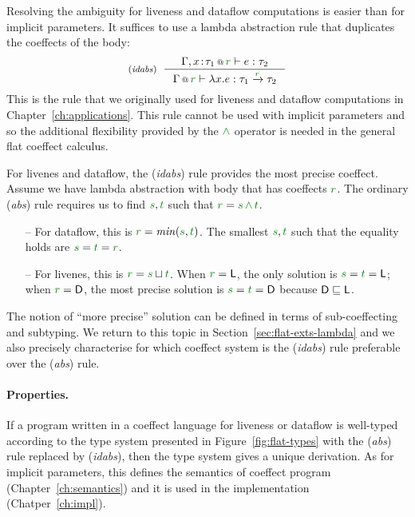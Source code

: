 Resolving the ambiguity for liveness and dataflow computations is easier than for implicit
parameters. It suffices to use a lambda abstraction rule that duplicates the coeffects of the
body:
%
\begin{equation*}
\tyrule{idabs}
  {\coctx{\Gamma, x\!:\!\tau_1}{\cclrd{r}} \vdash e : \tau_2}
  {\coctx{\Gamma}{\cclrd{r}} \vdash \lambda x.e : \tau_1 \xrightarrow{\cclrd{r}} \tau_2 }
\end{equation*}
%
This is the rule that we originally used for liveness and dataflow computations in
Chapter~\ref{ch:applications}. This rule cannot be used with implicit parameters and so
the additional flexibility provided by the $\czip$ operator is needed in the general flat
coeffect calculus.

For livenes and dataflow, the (\emph{idabs}) rule provides the most precise coeffect.
Assume we have lambda abstraction with body that has coeffects $\cclrd{r}$. The
ordinary (\emph{abs}) rule requires us to find $\cclrd{s}, \cclrd{t}$ such that
$\cclrd{r}=\cclrd{s}\,\czip\,\cclrd{t}$.

\begin{itemize}
  \item[--] For dataflow, this is $\cclrd{r}=\mathit{min}(\cclrd{s}, \cclrd{t})$. The smallest
    $\cclrd{s}, \cclrd{t}$ such that the equality holds are $\cclrd{s}=\cclrd{t}=\cclrd{r}$.
 \item[--] For livenes, this is $\cclrd{r}=\cclrd{s} \sqcup \cclrd{t}$. When $\cclrd{r}=\ident{L}$,
   the only solution is $\cclrd{s}=\cclrd{t}=\ident{L}$; when $\cclrd{r}=\ident{D}$, the most
   precise solution is $\cclrd{s}=\cclrd{t}=\ident{D}$ because $\textnormal{\sffamily D}\sqsubseteq\textnormal{\sffamily L}$.
\end{itemize}

The notion of ``more precise'' solution can be defined in terms of sub-coeffecting and subtyping.
We return to this topic in Section~\ref{sec:flat-exts-lambda} and we also precisely characterise
for which coeffect system is the (\emph{idabs}) rule preferable over the (\emph{abs}) rule.

\paragraph{Properties.}
If a program written in a coeffect language for liveness or dataflow is well-typed according to
the type system presented in Figure~\ref{fig:flat-types} with the (\emph{abs}) rule replaced by
(\emph{idabs}), then the type system gives a unique derivation. As for implicit parameters, this
defines the semantics of coeffect program (Chapter~\ref{ch:semantics}) and it is used in the
implementation (Chatper~\ref{ch:impl}).

